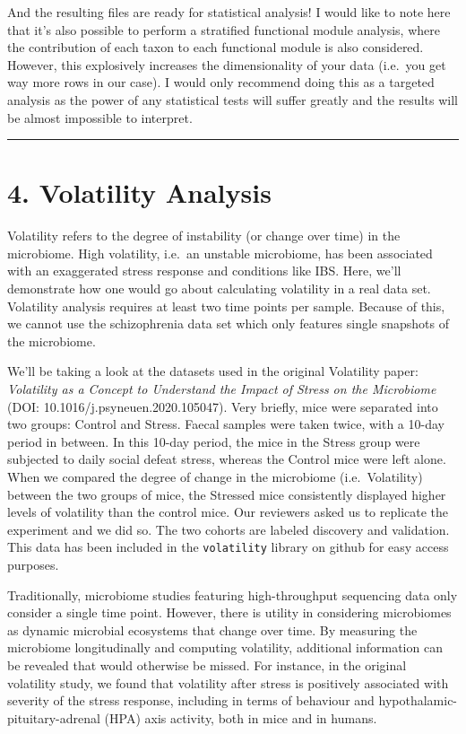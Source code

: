\documentclass[
]{article}
\begin{document}
And the resulting files are ready for statistical analysis! I would like
to note here that it's also possible to perform a stratified functional
module analysis, where the contribution of each taxon to each functional
module is also considered. However, this explosively increases the
dimensionality of your data (i.e.~you get way more rows in our case). I
would only recommend doing this as a targeted analysis as the power of
any statistical tests will suffer greatly and the results will be almost
impossible to interpret.

\begin{center}\rule{0.5\linewidth}{0.5pt}\end{center}

\newpage

\hypertarget{volatility-analysis}{%
\section{4. Volatility Analysis}\label{volatility-analysis}}

Volatility refers to the degree of instability (or change over time) in
the microbiome. High volatility, i.e.~an unstable microbiome, has been
associated with an exaggerated stress response and conditions like IBS.
Here, we'll demonstrate how one would go about calculating volatility in
a real data set. Volatility analysis requires at least two time points
per sample. Because of this, we cannot use the schizophrenia data set
which only features single snapshots of the microbiome.

We'll be taking a look at the datasets used in the original Volatility
paper: \emph{Volatility as a Concept to Understand the Impact of Stress
on the Microbiome} (DOI: 10.1016/j.psyneuen.2020.105047). Very briefly,
mice were separated into two groups: Control and Stress. Faecal samples
were taken twice, with a 10-day period in between. In this 10-day
period, the mice in the Stress group were subjected to daily social
defeat stress, whereas the Control mice were left alone. When we
compared the degree of change in the microbiome (i.e.~Volatility)
between the two groups of mice, the Stressed mice consistently displayed
higher levels of volatility than the control mice. Our reviewers asked
us to replicate the experiment and we did so. The two cohorts are
labeled discovery and validation. This data has been included in the
\texttt{volatility} library on github for easy access purposes.

Traditionally, microbiome studies featuring high-throughput sequencing
data only consider a single time point. However, there is utility in
considering microbiomes as dynamic microbial ecosystems that change over
time. By measuring the microbiome longitudinally and computing
volatility, additional information can be revealed that would otherwise
be missed. For instance, in the original volatility study, we found that
volatility after stress is positively associated with severity of the
stress response, including in terms of behaviour and
hypothalamic-pituitary-adrenal (HPA) axis activity, both in mice and in
humans.
\end{document}
